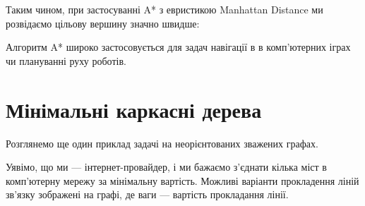 \documentclass[12pt,a4paper]{report}
\begin{document}
\begin{center}
\end{center}

Таким чином, при застосуванні A* з евристикою Manhattan Distance ми розвідаємо цільову вершину значно швидше:

\begin{center}
\end{center}

Алгоритм A* широко застосовується для задач навігації в в комп’ютерних іграх чи плануванні руху роботів.



\section{Мінімальні каркасні дерева}

Розглянемо ще один приклад задачі на неорієнтованих зважених графах.

Уявімо, що ми --- інтернет-провайдер, і ми бажаємо з’єднати кілька міст в комп’ютерну мережу за мінімальну вартість. Можливі варіанти прокладення ліній зв’язку зображені на графі, де ваги --- вартість прокладання лінії.
\end{document}

